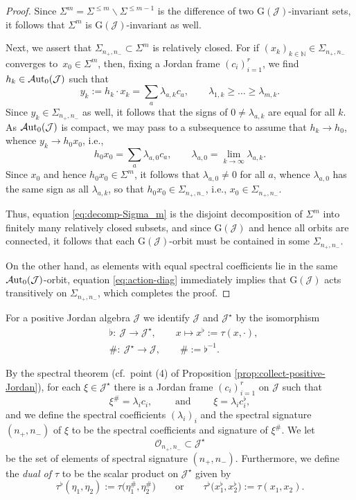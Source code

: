 \documentclass[pdftex]{sigma}
\numberwithin{equation}{section}
\newcommand{\Aut}{\mathcal{A}{\rm ut}}
\newcommand{\ocal}{\mathcal{O}}
\newcommand{\Jcal}{\mathcal{J}}
\newcommand{\G}{\mathrm{G}}
\newcommand{\N}{{\mathbb N}}
\begin{document}
\begin{proof}
Since $\Sigma^m = \Sigma^{\leq m} \backslash \Sigma^{\leq m-1}$ is the difference of two $\G(\Jcal)$-invariant sets, it follows that $\Sigma^m$ is $\G(\Jcal)$-invariant as well.

Next, we assert that $\Sigma_{n_+, n_-} \subset \Sigma^m$ is relatively closed. For if $(x_k)_{k \in \N} \in \Sigma_{n_+, n_-}$ converges to~$x_0 \in \Sigma^m$, then, fixing a Jordan frame $(c_i)_{i=1}^r$, we find $h_k \in \Aut_0(\Jcal)$ such that
\[
y_k := h_k \cdot x_k = \sum_a \lambda_{a,k} c_a, \qquad \lambda_{1,k} \geq \dots \geq \lambda_{m,k}.
\]
Since $y_k \in \Sigma_{n_+,n_-}$ as well, it follows that the signs of $0 \neq \lambda_{a,k}$ are equal for all $k$. As $\Aut_0(\Jcal)$ is compact, we may pass to a subsequence to assume that $h_k \to h_0$, whence $y_k \to h_0 x_0$, i.e.,
\[
h_0 x_0 = \sum_a \lambda_{a, 0} c_a, \qquad \lambda_{a,0} = \lim_{k\to\infty} \lambda_{a,k}.
\]
Since $x_0$ and hence $h_0 x_0 \in \Sigma^m$, it follows that $\lambda_{a,0} \neq 0$ for all $a$, whence $\lambda_{a,0}$ has the same sign as all $\lambda_{a,k}$, so that $h_0 x_0 \in \Sigma_{n_+, n_-}$, i.e., $x_0 \in \Sigma_{n_+, n_-}$.

Thus, equation \eqref{eq:decomp-Sigma_m} is the disjoint decomposition of $\Sigma^m$ into finitely many relatively closed subsets, and since $\G(\Jcal)$ and hence all orbits are connected, it follows that each $\G(\Jcal)$-orbit must be contained in some $\Sigma_{n_+,n_-}$.

On the other hand, as elements with equal spectral coefficients lie in the same $\Aut_0(\Jcal)$-orbit, equation \eqref{eq:action-diag} immediately implies that $\G(\Jcal)$ acts transitively on $\Sigma_{n_+,n_-}$, which completes the proof.
\end{proof}

For a positive Jordan algebra $\Jcal$ we identify $\Jcal$ and $\Jcal^\star$ by the isomorphism
\begin{align*}
&\flat\colon\ \Jcal \longrightarrow \Jcal^\star, \qquad x \longmapsto x^\flat := \tau(x, \cdot),\\
&\#\colon\ \Jcal^\star \longrightarrow \Jcal, \qquad \# := \flat^{-1}.
\end{align*}

By the spectral theorem (cf.\ point (4) of Proposition \ref{prop:collect-positive-Jordan}), for each $\xi \in \Jcal^\star$ there is a Jordan frame $(c_i)_{i=1}^r$ on $\Jcal$ such that
\[
\xi^\# = \lambda_i c_i,\qquad \mbox{ and } \qquad \xi = \lambda_i c_i^\flat,
\]
and we define the spectral coefficients $(\lambda_i)_i$ and the spectral signature $(n_+,n_-)$ of $\xi$ to be the spectral coefficients and signature of $\xi^\# $. We let
\[
\ocal_{n_+,n_-} \subset \Jcal^\star
\]
be the set of elements of spectral signature $(n_+,n_-)$. Furthermore, we define the {\em dual of $\tau$ } to be the scalar product on $\Jcal^\star$ given by
\[ %
\tau^\flat (\eta_1, \eta_2) := \tau\big(\eta_1^\#, \eta_2^\#\big) \qquad \mathrm{or} \qquad \tau^\flat \big(x_1^\flat, x_2^\flat\big) := \tau(x_1, x_2).
\]
\end{document}
